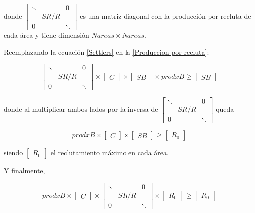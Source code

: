 \documentclass[12pt, oneside, a4paper]{article}
\begin{document}
donde $\begin{bmatrix} \ddots& & 0 \\ & SR/R & \\ 0 & & \ddots\end{bmatrix}$ es una matriz diagonal con la producción por recluta de cada área y tiene dimensión $Nareas \times Nareas$. 

Reemplazando la ecuación \ref{Settlers} en la \ref{Produccion por recluta}:

\begin{equation}\label{Produccion A}
   \begin{bmatrix} \ddots& & 0 \\ & SR/R & \\ 0 & & \ddots\end{bmatrix} \times \begin{bmatrix} C \end{bmatrix} \times \begin{bmatrix} SB \end{bmatrix} \times prodxB \geq \begin{bmatrix} SB \end{bmatrix}
\end {equation}

donde al multiplicar ambos lados por la inversa de $\begin{bmatrix} \ddots& & 0 \\ & SR/R & \\ 0 & & \ddots\end{bmatrix}$ queda

\begin{equation}\label{Produccion B}
    prodxB \times \begin{bmatrix} C \end{bmatrix} \times \begin{bmatrix} SB \end{bmatrix} \geq \begin{bmatrix} R_{0} \end{bmatrix}
\end {equation}

siendo $\begin{bmatrix} R_{0} \end{bmatrix}$ el reclutamiento máximo en cada área.

Y finalmente,

\begin{equation}\label{Produccion C}
    prodxB \times \begin{bmatrix} C \end{bmatrix} \times \begin{bmatrix} \ddots& & 0 \\ & SR/R & \\ 0 & & \ddots\end{bmatrix} \times \begin{bmatrix} R_{0} \end{bmatrix} \geq \begin{bmatrix} R_{0} \end{bmatrix}
\end {equation}
\end{document}
